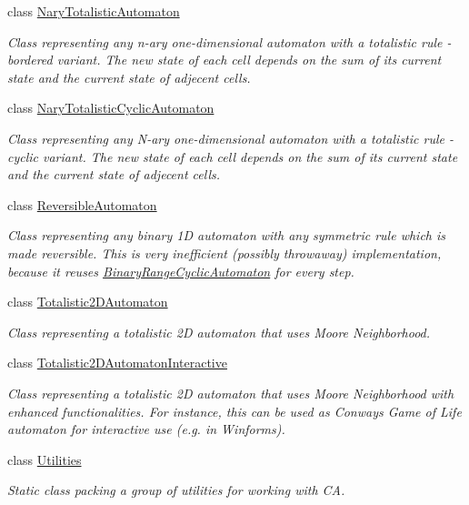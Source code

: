 \begin{DoxyCompactItemize}
class \hyperlink{class_cellular_1_1_nary_totalistic_automaton}{Nary\+Totalistic\+Automaton}
\begin{DoxyCompactList}\small\item\em Class representing any n-\/ary one-\/dimensional automaton with a totalistic rule -\/ bordered variant. The new state of each cell depends on the sum of its current state and the current state of adjecent cells. \end{DoxyCompactList}\item 
class \hyperlink{class_cellular_1_1_nary_totalistic_cyclic_automaton}{Nary\+Totalistic\+Cyclic\+Automaton}
\begin{DoxyCompactList}\small\item\em Class representing any N-\/ary one-\/dimensional automaton with a totalistic rule -\/ cyclic variant. The new state of each cell depends on the sum of its current state and the current state of adjecent cells. \end{DoxyCompactList}\item 
class \hyperlink{class_cellular_1_1_reversible_automaton}{Reversible\+Automaton}
\begin{DoxyCompactList}\small\item\em Class representing any binary 1\+D automaton with any symmetric rule which is made reversible. This is very inefficient (possibly throwaway) implementation, because it reuses {\ttfamily \hyperlink{class_cellular_1_1_binary_range_cyclic_automaton}{Binary\+Range\+Cyclic\+Automaton}} for every step. \end{DoxyCompactList}\item 
class \hyperlink{class_cellular_1_1_totalistic2_d_automaton}{Totalistic2\+D\+Automaton}
\begin{DoxyCompactList}\small\item\em Class representing a totalistic 2\+D automaton that uses Moore Neighborhood. \end{DoxyCompactList}\item 
class \hyperlink{class_cellular_1_1_totalistic2_d_automaton_interactive}{Totalistic2\+D\+Automaton\+Interactive}
\begin{DoxyCompactList}\small\item\em Class representing a totalistic 2\+D automaton that uses Moore Neighborhood with enhanced functionalities. For instance, this can be used as Conway\textquotesingle{}s Game of Life automaton for interactive use (e.\+g. in Winforms). \end{DoxyCompactList}\item 
class \hyperlink{class_cellular_1_1_utilities}{Utilities}
\begin{DoxyCompactList}\small\item\em Static class packing a group of utilities for working with C\+A. \end{DoxyCompactList}\end{DoxyCompactItemize}
